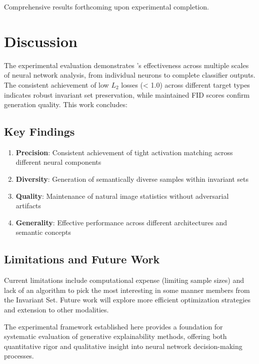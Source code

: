 Comprehensive results forthcoming upon experimental completion.

\section{Discussion}

The experimental evaluation demonstrates \method{}'s effectiveness across multiple scales of neural network analysis, from individual neurons to complete classifier outputs. The consistent achievement of low $L_2$ losses (< 1.0) across different target types indicates robust invariant set preservation, while maintained FID scores confirm generation quality. This work concludes:

\subsection{Key Findings}

\begin{enumerate}
\item \textbf{Precision}: Consistent achievement of tight activation matching across different neural components
\item \textbf{Diversity}: Generation of semantically diverse samples within invariant sets
\item \textbf{Quality}: Maintenance of natural image statistics without adversarial artifacts
\item \textbf{Generality}: Effective performance across different architectures and semantic concepts
\end{enumerate}

\subsection{Limitations and Future Work}

Current limitations include computational expense (limiting sample sizes) and lack of an algorithm to pick the most interesting in some manner members from the Invariant Set. Future work will explore more efficient optimization strategies and extension to other modalities.

The experimental framework established here provides a foundation for systematic evaluation of generative explainability methods, offering both quantitative rigor and qualitative insight into neural network decision-making processes.

